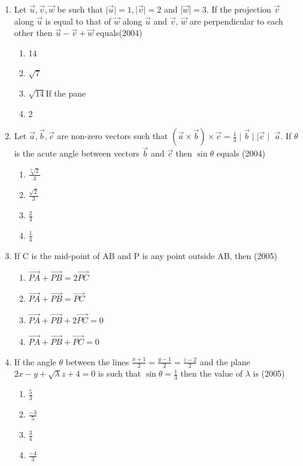 \documentclass[12pt]{article}
\providecommand{\brak}[1]{\ensuremath{\left(#1\right)}}
\begin{document}
\begin{enumerate}
\item Let $\vec{u},\vec{v},\vec{w}$ be such that $\mid \vec{u} \mid =1, \mid \vec{v}\mid =2$ and $\mid \vec{w} \mid =3$. If the projection $\vec{v}$ along $\vec{u}$ is equal to that of $\vec{w}$ along $\vec{u}$ and $\vec{v}$, $\vec{w}$ are perpendicular to each other then $\vec{u}-\vec{v}+\vec{w}$ equals(2004)
\begin{enumerate}
\item 14
\item $\sqrt{7}$
\item $\sqrt{14}$If the pane 
\item 2
\end{enumerate} 
\item Let $\vec{a},\vec{b},\vec{c}$ are non-zero vectors such that $\brak{\vec{a}\times\vec{b}}\times\vec{c}=\frac{1}{3} \mid \vec{b} \mid  \mid \vec{c} \mid$ $\vec{a}$. If $\theta$ is the acute angle between vectors $\vec{b}$ and $\vec{c}$ then $\sin \theta$ equals (2004)
\begin{enumerate}
\item $\frac{\sqrt[2]{2}}{3}$
\item $\frac{\sqrt{2}}{3}$
\item $\frac{2}{3}$
\item $\frac{1}{3}$
\end{enumerate}
\item If C is the mid-point of AB and P is any point outside AB, then (2005)
\begin{enumerate}
\item $\overrightarrow{PA}+\overrightarrow{PB}=2\overrightarrow{PC}$
\item $\overrightarrow{PA}+\overrightarrow{PB}=\overrightarrow{PC}$
\item $\overrightarrow{PA}+\overrightarrow{PB}+2\overrightarrow{PC}=0$
\item $\overrightarrow{PA}+\overrightarrow{PB}+\overrightarrow{PC}=0$
\end{enumerate}
\item If the angle $\theta$ between the lines $\frac{x+1}{2}=\frac{y-1}{2}=\frac{z-2}{2}$ and the plane $2x-y+\sqrt{\lambda}z+4=0$ is such that $\sin\theta=\frac{1}{3}$ then the value of $\lambda$ is (2005)
\begin{enumerate}
\item  $\frac{5}{3}$
\item $\frac{-3}{5}$
\item $\frac{3}{4}$
\item $\frac{-4}{3}$
\end{enumerate}

\end{enumerate}
\end{document}
